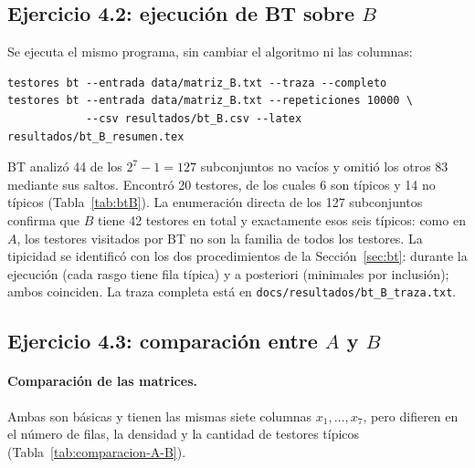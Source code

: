 \documentclass[11pt, a4paper]{article}
\theoremstyle{definition}
\theoremstyle{plain}
\newcommand{\x}[1]{x_{#1}}
\begin{document}
\subsection{Ejercicio 4.2: ejecución de BT sobre $B$}

Se ejecuta el mismo programa, sin cambiar el algoritmo ni las columnas:
\begin{Verbatim}[fontsize=\small, frame=single]
testores bt --entrada data/matriz_B.txt --traza --completo
testores bt --entrada data/matriz_B.txt --repeticiones 10000 \
            --csv resultados/bt_B.csv --latex resultados/bt_B_resumen.tex
\end{Verbatim}
BT analizó 44 de los $2^7-1=127$ subconjuntos no vacíos y omitió los otros 83
mediante sus saltos. Encontró 20 testores, de los cuales 6 son típicos y 14 no
típicos (Tabla~\ref{tab:btB}). La enumeración directa de los 127 subconjuntos
confirma que $B$ tiene 42 testores en total y exactamente esos seis típicos:
como en $A$, los testores visitados por BT no son la familia de todos los
testores. La tipicidad se identificó con los dos procedimientos de la
Sección~\ref{sec:bt}: durante la ejecución (cada rasgo tiene fila típica) y a
posteriori (minimales por inclusión); ambos coinciden. La traza completa está en
\texttt{docs/resultados/bt\_B\_traza.txt}.

\begin{table}[htbp]
\centering
\small

\caption{BT sobre $B$: resultado computacional y tiempo total (mediana de
10\,000 ejecuciones).}
\label{tab:btB}
\end{table}

\subsection{Ejercicio 4.3: comparación entre $A$ y $B$}

\paragraph{Comparación de las matrices.} Ambas son básicas y tienen las mismas
siete columnas $\x1,\ldots,\x7$, pero difieren en el número de filas, la densidad
y la cantidad de testores típicos (Tabla~\ref{tab:comparacion-A-B}).
\end{document}
